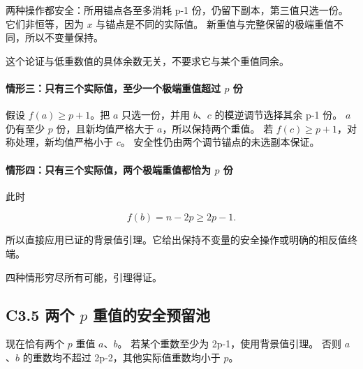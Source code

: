 {两种操作都安全：所用锚点各至多消耗} {p-1} {份，仍留下副本，第三值只选一份。} {它们非恒等，因为} {\ensuremath{x}} {与锚点是不同的实际值。} {新重值与完整保留的极端重值不同，所以不变量保持。}

{这个论证与低重数值的具体余数无关，不要求它与某个重值同余。}

\paragraph*{\texorpdfstring{{情形三：只有三个实际值，至少一个极端重值超过} {\ensuremath{p}} {份}}{情形三：只有三个实际值，至少一个极端重值超过  份}}\label{C3-h16}

{假设} {\ensuremath{f(a)\ge p+1}。把} {\ensuremath{a}} {只选一份，并用} {\ensuremath{b}、\ensuremath{c}} {的模逆调节选择其余} {p-1} {份。} {\ensuremath{a}} {仍有至少} {\ensuremath{p}} {份，且新均值严格大于} {\ensuremath{a}，所以保持两个重值。} {若} {\ensuremath{f(c)\ge p+1}，对称处理，新均值严格小于} {\ensuremath{c}。} {安全性仍由两个调节锚点的未选副本保证。}

\paragraph*{\texorpdfstring{{情形四：只有三个实际值，两个极端重值都恰为} {\ensuremath{p}} {份}}{情形四：只有三个实际值，两个极端重值都恰为  份}}\label{C3-h17}

{此时}

\[
f(b)=n-2p\ge2p-1.
\]

{所以直接应用已证的背景值引理。它给出保持不变量的安全操作或明确的相反值终端。}

{四种情形穷尽所有可能，引理得证。}

\subsection*{\texorpdfstring{{C3.5} {两个} {\ensuremath{p}} {重值的安全预留池}}{C3.5 两个  重值的安全预留池}}\label{C3-h18}

{现在恰有两个} {\ensuremath{p}} {重值} {\ensuremath{a}、\ensuremath{b}。} {若某个重数至少为} {2p-1，使用背景值引理。} {否则} {\ensuremath{a}、\ensuremath{b}} {的重数均不超过} {2p-2，其他实际值重数均小于} {\ensuremath{p}。}

